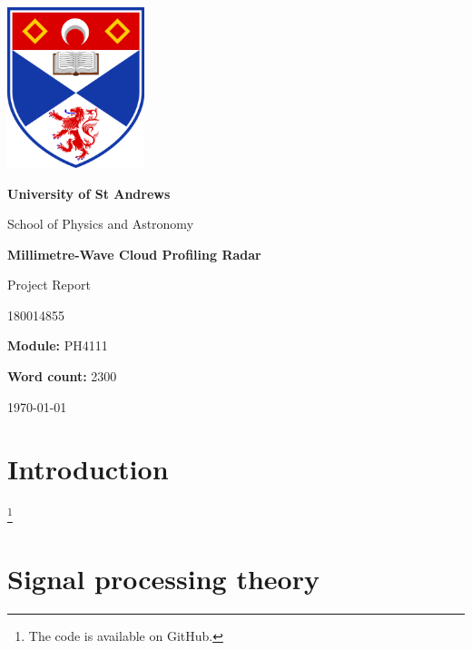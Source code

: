 \documentclass{article}
\title {\mytitle}
\author{\myauthor}
\date  {\mydate}
\newcommand\mytitle    {Millimetre-Wave Cloud Profiling Radar}
\newcommand\mysubtitle {Project Report}
\newcommand\myauthor   {180014855}
\newcommand\mymodule   {PH4111}
\newcommand\mywordcount{2300}
\begin{document}
\begin{titlepage}
	\centering
	{\includegraphics[width=0.3\textwidth]{uos-logo}}
	\par
	{\LARGE\bfseries University of St Andrews\par}
	{\LARGE School of Physics and Astronomy\par}
	\vspace{1.5cm}
	{\huge\bfseries\mytitle\par}
	{\Large\mysubtitle\par}
	\vspace{2cm}
	{\Large\myauthor\par}
	{\large\textbf{Module:} \mymodule\par}
	{\large\textbf{Word count:} \mywordcount\par}
	\vfill
	{\large\today\par}
\end{titlepage}

\begin{abstract}
	Insert abstract here.
\end{abstract}

\tableofcontents
\clearpage
\printglossary

\section{Introduction}

\footnote{The code is available on GitHub.\supercite{Code}}

\section{Signal processing theory}
\end{document}
